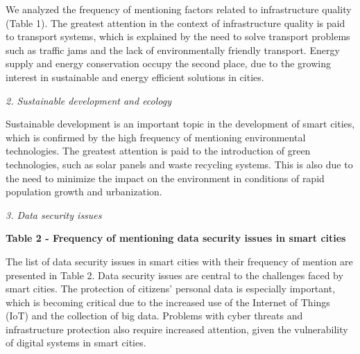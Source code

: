 We analyzed the frequency of mentioning factors related to
infrastructure quality (Table 1). The greatest attention in the context
of infrastructure quality is paid to transport systems, which is
explained by the need to solve transport problems such as traffic jams
and the lack of environmentally friendly transport. Energy supply and
energy conservation occupy the second place, due to the growing interest
in sustainable and energy efficient solutions in cities.

\emph{2. Sustainable development and ecology}

Sustainable development is an important topic in the development of
smart cities, which is confirmed by the high frequency of mentioning
environmental technologies. The greatest attention is paid to the
introduction of green technologies, such as solar panels and waste
recycling systems. This is also due to the need to minimize the impact
on the environment in conditions of rapid population growth and
urbanization.

\emph{3. Data security issues}

{\bfseries Table 2 - Frequency of mentioning data security issues in smart
cities}


The list of data security issues in smart cities with their frequency of
mention are presented in Table 2. Data security issues are central to
the challenges faced by smart cities. The protection of
citizens'{} personal data is especially important, which
is becoming critical due to the increased use of the Internet of Things
(IoT) and the collection of big data. Problems with cyber threats and
infrastructure protection also require increased attention, given the
vulnerability of digital systems in smart cities.

